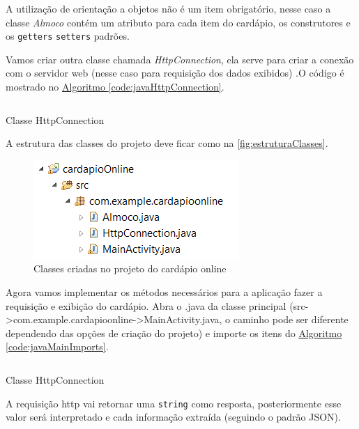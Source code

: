 \documentclass[a4paper,12pt,brazil,oneside]{book}
\begin{document}
A utilização de orientação a objetos não é um item obrigatório, nesse caso a classe \emph{Almoco} contém um atributo para cada item do cardápio, os construtores e os \texttt{getters} \texttt{setters} padrões.

Vamos criar outra classe chamada \emph{HttpConnection}, ela serve para criar a conexão com o servidor web (nesse caso para requisição dos dados exibidos) .O código é mostrado no \hyperref[code:javaHttpConnection]{Algoritmo \ref*{code:javaHttpConnection}}.

\begin{listing}[H]
	\inputminted[linenos=true,fontsize=\small,frame=lines, framesep=2mm, tabsize=2,numbersep=5pt]{xml}{src/devapp/cardapio/HttpConnection.java}
	\caption{Classe HttpConnection}
	\label{code:javaHttpConnection}
	\end{listing}

A estrutura das classes do projeto deve ficar como na \autoref{fig:estruturaClasses}.

\begin{figure}[H]
  \centering
  \includegraphics[width=.45\textwidth]{figuras/devapp/cardapio/estrutura.png}
  \caption{Classes criadas no projeto do cardápio online}
  \label{fig:estruturaClasses}
\end{figure}

Agora vamos implementar os métodos necessários para a aplicação fazer a requisição e exibição do cardápio. Abra o .java da classe principal (src->com.example.cardapioonline->MainActivity.java, o caminho pode ser diferente dependendo das opções de criação do projeto) e importe os itens do \hyperref[code:javaMainImports]{Algoritmo \ref*{code:javaMainImports}}.

\begin{listing}[H]
	\inputminted[linenos=true,fontsize=\small,frame=lines, framesep=2mm, tabsize=2,numbersep=5pt]{xml}{src/devapp/cardapio/mainImports.java}
	\caption{Classe HttpConnection}
	\label{code:javaMainImports}
	\end{listing}
	
A requisição http vai retornar uma \texttt{string} como resposta, posteriormente esse valor será interpretado e cada informação extraída (seguindo o padrão JSON).
\end{document}
